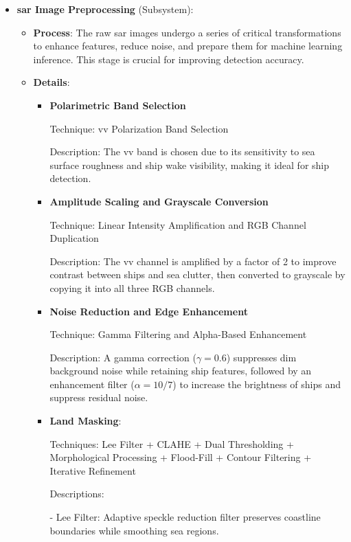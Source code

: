 \documentclass{article}
\begin{document}
\begin{itemize}
    \item \textbf{\acrshort{sar} Image Preprocessing} (Subsystem):
    \begin{itemize}
        \item \textbf{Process}: The raw \acrshort{sar} images undergo a series of critical transformations to enhance features, reduce noise, and prepare them for machine learning inference. This stage is crucial for improving detection accuracy.
        \item \textbf{Details}:
        \begin{itemize}
            \item \textbf{Polarimetric Band Selection}
            
            Technique: \acrshort{vv} Polarization Band Selection
            
            Description: The \acrshort{vv} band is chosen due to its sensitivity to sea  surface roughness and ship wake visibility, making it ideal for ship detection.
            \item \textbf{Amplitude Scaling and Grayscale Conversion}
            
            Technique: Linear Intensity Amplification and RGB Channel Duplication
            
            Description: The \acrshort{vv} channel is amplified by a factor of 2 to improve contrast between ships and sea clutter, then converted to grayscale by copying it into all three RGB channels. \item \textbf{Noise Reduction and Edge Enhancement}
            
            Technique: Gamma Filtering and Alpha-Based Enhancement
           
            Description: A gamma correction ($\gamma = 0.6$) suppresses dim background noise while retaining ship features, followed by an enhancement filter ($\alpha = 10/7$) to increase the brightness of ships and suppress residual noise. \item \textbf{Land Masking}:
            
            Techniques: Lee Filter + CLAHE + Dual Thresholding + Morphological Processing + Flood-Fill + Contour Filtering + Iterative Refinement
        
            Descriptions:
            
            - Lee Filter: Adaptive speckle reduction filter preserves coastline boundaries while smoothing sea regions.
            

\end{itemize}
\end{itemize}
\end{itemize}
\end{document}
